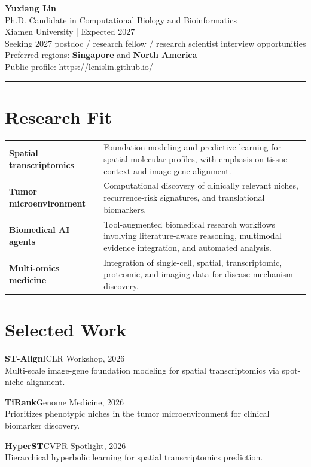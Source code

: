 \documentclass[10pt,a4paper]{article}
\newcommand{\tagline}[1]{\textcolor{muted}{\large #1}}
\newcommand{\venue}[1]{\textcolor{muted}{#1}}
\newcommand{\pubitem}[3]{%
  \textbf{#1}\hfill\venue{#3}\\
  #2\par\vspace{0.35em}
}
\begin{document}
{\Huge\bfseries\color{accent} Yuxiang Lin}\\[0.3em]
\tagline{Ph.D. Candidate in Computational Biology and Bioinformatics}\\
\tagline{Xiamen University \quad | \quad Expected 2027}\\[0.55em]
{\large Seeking 2027 postdoc / research fellow / research scientist interview opportunities}\\
{\large Preferred regions: \textbf{Singapore} and \textbf{North America}}\\[0.45em]
\textcolor{muted}{Public profile: \href{https://lenislin.github.io/}{https://lenislin.github.io/}}

\vspace{0.8em}
\color{rulegray}\hrule
\vspace{0.75em}
\color{bodytext}

\section*{Research Fit}
\begin{tabularx}{\textwidth}{>{\bfseries\color{accent}}p{} X}
Spatial transcriptomics &
Foundation modeling and predictive learning for spatial molecular profiles, with emphasis on tissue context and image-gene alignment.\\[0.45em]
Tumor microenvironment &
Computational discovery of clinically relevant niches, recurrence-risk signatures, and translational biomarkers.\\[0.45em]
Biomedical AI agents &
Tool-augmented biomedical research workflows involving literature-aware reasoning, multimodal evidence integration, and automated analysis.\\[0.45em]
Multi-omics medicine &
Integration of single-cell, spatial, transcriptomic, proteomic, and imaging data for disease mechanism discovery.
\end{tabularx}

\section*{Selected Work}
\pubitem{ST-Align}
{Multi-scale image-gene foundation modeling for spatial transcriptomics via spot-niche alignment.}
{ICLR Workshop, 2026}

\pubitem{TiRank}
{Prioritizes phenotypic niches in the tumor microenvironment for clinical biomarker discovery.}
{Genome Medicine, 2026}

\pubitem{HyperST}
{Hierarchical hyperbolic learning for spatial transcriptomics prediction.}
{CVPR Spotlight, 2026}
\end{document}
